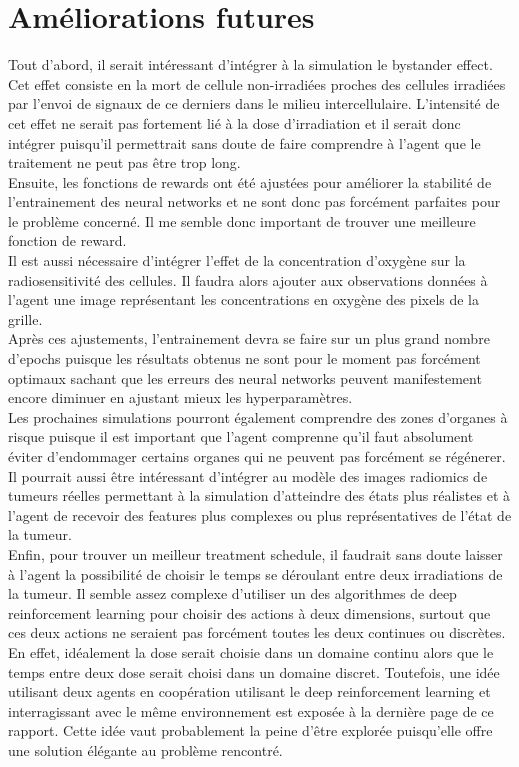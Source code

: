 \documentclass[12pt]{article}
\begin{document}
\section{Améliorations futures}
Tout d'abord, il serait intéressant d'intégrer à la simulation le bystander effect. Cet effet consiste en la mort de cellule non-irradiées proches des cellules irradiées par l'envoi de signaux de ce derniers dans le milieu intercellulaire. L'intensité de cet effet ne serait pas fortement lié à la dose d'irradiation et il serait donc intégrer puisqu'il permettrait sans doute de faire comprendre à l'agent que le traitement ne peut pas être trop long.\\

Ensuite, les fonctions de rewards ont été ajustées pour améliorer la stabilité de l'entrainement des neural networks et ne sont donc pas forcément parfaites pour le problème concerné. Il me semble donc important de trouver une meilleure fonction de reward.\\

Il est aussi nécessaire d'intégrer l'effet de la concentration d'oxygène sur la radiosensitivité des cellules. Il faudra alors ajouter aux observations données à l'agent une image représentant les concentrations en oxygène des pixels de la grille.\\

Après ces ajustements, l'entrainement devra se faire sur un plus grand nombre d'epochs puisque les résultats obtenus ne sont pour le moment pas forcément optimaux sachant que les erreurs des neural networks peuvent manifestement encore diminuer en ajustant mieux les hyperparamètres.\\

Les prochaines simulations pourront également comprendre des zones d'organes à risque puisque il est important que l'agent comprenne qu'il faut absolument éviter d'endommager certains organes qui ne peuvent pas forcément se régénerer.\\

Il pourrait aussi être intéressant d'intégrer au modèle des images radiomics de tumeurs réelles permettant à la simulation d'atteindre des états plus réalistes et à l'agent de recevoir des features plus complexes ou plus représentatives de l'état de la tumeur.\\

Enfin, pour trouver un meilleur treatment schedule, il faudrait sans doute laisser à l'agent la possibilité de choisir le temps se déroulant entre deux irradiations de la tumeur. Il semble assez complexe d'utiliser un des algorithmes de deep reinforcement learning pour choisir des actions à deux dimensions, surtout que ces deux actions ne seraient pas forcément toutes les deux continues ou discrètes. En effet, idéalement la dose serait choisie dans un domaine continu alors que le temps entre deux dose serait choisi dans un domaine discret. Toutefois, une idée utilisant deux agents en coopération utilisant le deep reinforcement learning et interragissant avec le même environnement est exposée à la dernière page de ce rapport. Cette idée vaut probablement la peine d'être explorée puisqu'elle offre une solution élégante au problème rencontré.



\end{document}
